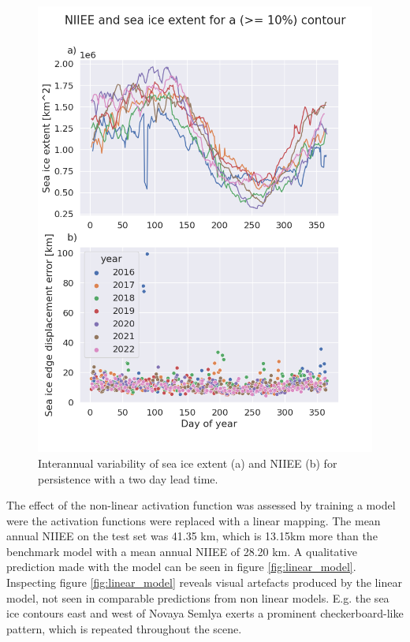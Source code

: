 \documentclass[../main/thesis]{subfiles}
\begin{document}
\begin{figure}
    \centering
    \includegraphics[width=.8\textwidth]{Persistence_NIIEE_SIE}
    \caption{\label{fig:NIIEE-and-SIE}Interannual variability of sea ice extent (a) and NIIEE (b) for persistence with a two day lead time.}
\end{figure}

The effect of the non-linear activation function was assessed by training a model were the activation functions were replaced with a linear mapping. The mean annual NIIEE on the test set was 41.35 km, which is 13.15km more than the benchmark model with a mean annual NIIEE of 28.20 km. A qualitative prediction made with the model can be seen in figure \ref{fig:linear_model}. Inspecting figure \ref{fig:linear_model} reveals visual artefacts produced by the linear model, not seen in comparable predictions from non linear models. E.g. the sea ice contours east and west of Novaya Semlya exerts a prominent checkerboard-like pattern, which is repeated throughout the scene. 
\end{document}
